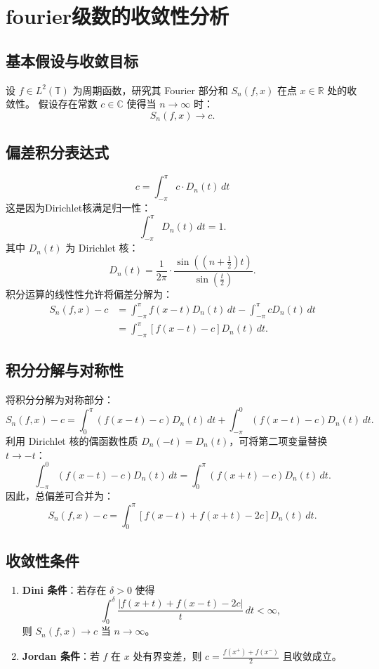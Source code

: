 \documentclass[12pt]{article}
\begin{document}
	\section{fourier级数的收敛性分析}
	
	\subsection{基本假设与收敛目标}
	设 $f \in L^2(\mathbb{T})$ 为周期函数，研究其 Fourier 部分和 $S_n(f,x)$ 在点 $x \in \mathbb{R}$ 处的收敛性。  
	假设存在常数 $c \in \mathbb{C}$ 使得当 $n \to \infty$ 时：
	\[
	S_n(f, x) \to c.
	\]
	
	\subsection{偏差积分表达式}

	\[
	c = \int_{-\pi}^{\pi} c \cdot D_n(t) \, dt
	\]
	这是因为Dirichlet核满足归一性：
	\[
	\int_{-\pi}^{\pi} D_n(t) \, dt = 1.
	\]
	其中 $D_n(t)$ 为 Dirichlet 核：
	\[
	D_n(t) = \frac{1}{2\pi} \cdot \frac{\sin\left( (n+\frac{1}{2})t \right)}{\sin\left( \frac{t}{2} \right)}.
	\]
	积分运算的线性性允许将偏差分解为：
	\[
	\begin{aligned}
		S_n(f, x) - c &= \int_{-\pi}^{\pi} f(x-t) D_n(t) \, dt - \int_{-\pi}^{\pi} c D_n(t) \, dt \\
		&= \int_{-\pi}^{\pi} \left[ f(x-t) - c \right] D_n(t) \, dt.
	\end{aligned}
	\]

	
	
	\subsection{积分分解与对称性}
	将积分分解为对称部分：
	\[
	S_n(f, x) - c = \int_{0}^{\pi} \left( f(x-t) - c \right) D_n(t) \, dt + \int_{-\pi}^{0} \left( f(x-t) - c \right) D_n(t) \, dt.
	\]
	利用 Dirichlet 核的偶函数性质 $D_n(-t) = D_n(t)$，可将第二项变量替换 $t \to -t$：
	\[
	\int_{-\pi}^{0} \left( f(x-t) - c \right) D_n(t) \, dt = \int_{0}^{\pi} \left( f(x+t) - c \right) D_n(t) \, dt.
	\]
	因此，总偏差可合并为：
	\[
	S_n(f, x) - c = \int_{0}^{\pi} \left[ f(x-t) + f(x+t) - 2c \right] D_n(t) \, dt.
	\]
	
	\subsection{收敛性条件}
	\begin{enumerate}[leftmargin=2cm]
		\item \textbf{Dini 条件}：若存在 $\delta > 0$ 使得
		\[
		\int_{0}^{\delta} \frac{|f(x+t) + f(x-t) - 2c|}{t} \, dt < \infty,
		\]
		则 $S_n(f, x) \to c$ 当 $n \to \infty$。
		
		\item \textbf{Jordan 条件}：若 $f$ 在 $x$ 处有界变差，则 $c = \frac{f(x^+) + f(x^-)}{2}$ 且收敛成立。
	\end{enumerate}
	
\end{document}
